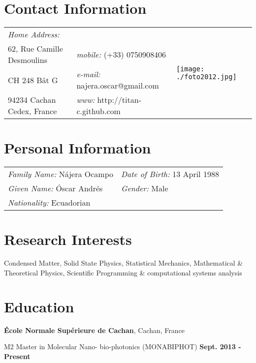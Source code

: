 \documentclass[margin,line]{res}
\newenvironment{list1}{
  \begin{list}{\ding{113}}{%
      \setlength{\itemsep}{0in}
      \setlength{\parsep}{0in} \setlength{\parskip}{0in}
      \setlength{\topsep}{0in} \setlength{\partopsep}{0in} 
      \setlength{\leftmargin}{0.17in}}}{\end{list}}
\begin{document}

\begin{resume}

\section{\sc Contact Information}
  \begin{tabular}{@{}p{2in}p{2.5in}p{3cm} }
    {\it Home Address:}    &  &
      \multirow{4}{*}{ \texttt{[image: ./foto2012.jpg]}}\\

    62, Rue Camille Desmoulins & {\it mobile:} (+33) 0750908406 \\
    CH 248 Bât G      & {\it e-mail:}  najera.oscar@gmail.com\\
    94234 Cachan Cedex, France    & {\it www:} http://titan-c.github.com
  \end{tabular}\vspace{0.4cm}

\section{\sc Personal Information}
 \begin{tabular}{ll}
  {\it Family Name:} Nájera Ocampo & {\it Date of Birth:} 13 April 1988\\
  {\it Given Name:} Óscar Andrés   & {\it Gender:} Male\\
  {\it Nationality:} Ecuadorian    & %
 \end{tabular}

\section{\sc Research Interests}
  Condensed Matter, Solid State Physics, Statistical Mechanics, Mathematical \& Theoretical Physics, Scientific Programming \& computational systems analysis

\section{\sc Education}
  {\bf École Normale Supérieure de Cachan}, Cachan, France\\
  \vspace{-.1in}
  \begin{list1}
    \item[] M2 Master in Molecular Nano- bio-photonics (MONABIPHOT) \hfill 
{\bf Sept. 2013 - Present}
  \end{list1}


\end{resume}
\end{document}
